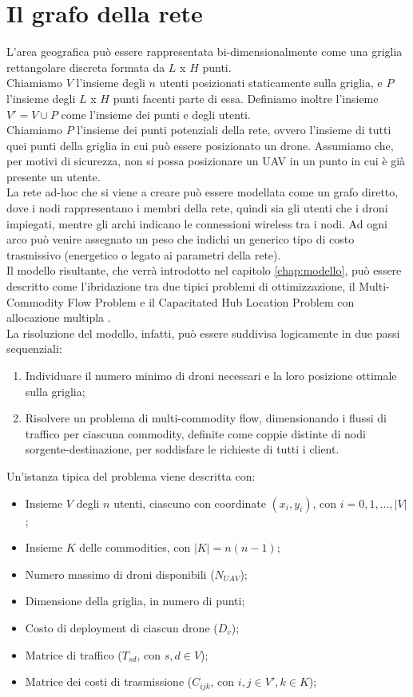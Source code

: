 \section{Il grafo della rete} \label{sect:graforete}
L'area geografica può essere rappresentata bi-dimensionalmente come una griglia rettangolare discreta formata da $L$ x $H$ punti. \\
Chiamiamo $V$ l'insieme degli $n$ utenti posizionati staticamente sulla griglia, e $P$ l'insieme degli $L$ x $H$ punti facenti parte di essa. Definiamo inoltre l'insieme $V' = V \cup P$ come l'insieme dei punti e degli utenti. \\
Chiamiamo $P$ l'insieme dei punti potenziali della rete, ovvero l'insieme di tutti quei punti della griglia in cui può essere posizionato un drone. Assumiamo che, per motivi di sicurezza, non si possa posizionare un UAV in un punto in cui è già presente un utente. \\
La rete ad-hoc che si viene a creare può essere modellata come un grafo diretto, dove i nodi rappresentano i membri della rete, quindi sia gli utenti che i droni impiegati, mentre gli archi indicano le connessioni wireless tra i nodi. Ad ogni arco può venire assegnato un peso che indichi un generico tipo di costo trasmissivo (energetico o legato ai parametri della rete). \\

Il modello risultante, che verrà introdotto nel capitolo \ref{chap:modello}, può essere descritto come l'ibridazione tra due tipici problemi di ottimizzazione, il Multi-Commodity Flow Problem e il Capacitated Hub Location Problem con allocazione multipla \cite{Alumur20081}. \\
La risoluzione del modello, infatti, può essere suddivisa logicamente in due passi sequenziali:
\begin{enumerate}  
	\item Individuare il numero minimo di droni necessari e la loro posizione ottimale sulla griglia; 
	\item Risolvere un problema di multi-commodity flow, dimensionando i flussi di traffico per ciascuna commodity, definite come coppie distinte di nodi sorgente-destinazione, per soddisfare le richieste di tutti i client.
\end{enumerate}
Un'istanza tipica del problema viene descritta con:
\begin{itemize}  
	\item Insieme $V$ degli $n$ utenti, ciascuno con coordinate $(x_i,y_i)$, con $i = 0,1,...,|V|$;
	\item Insieme $K$ delle commodities, con $|K| = n (n-1)$;
	\item Numero massimo di droni disponibili ($N_{UAV}$);
	\item Dimensione della griglia, in numero di punti;
	\item Costo di deployment di ciascun drone ($D_v$); 
	\item Matrice di traffico ($T_{sd}$, con $s,d \in V$);
	\item Matrice dei costi di trasmissione ($C_{ijk}$, con $i,j \in V', k \in K$);
\end{itemize}

